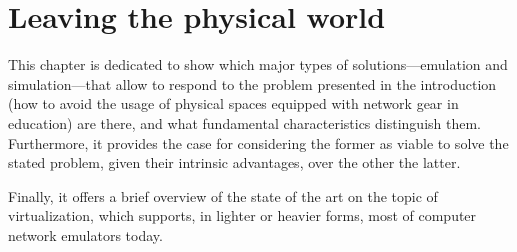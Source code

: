 
\chapter{Leaving the physical world}
\label{ch:leavingthephysicalworld}

This chapter is dedicated to show which major types of solutions---emulation and simulation---that allow to respond to the problem presented in the introduction (how to avoid the usage of physical spaces equipped with network gear in education) are there, and what fundamental characteristics distinguish them.
Furthermore, it provides the case for considering the former as viable to solve the stated problem, given their intrinsic advantages, over the other the latter.

Finally, it offers a brief overview of the state of the art on the topic of virtualization, which supports, in lighter or heavier forms, most of computer network emulators today.






% 


